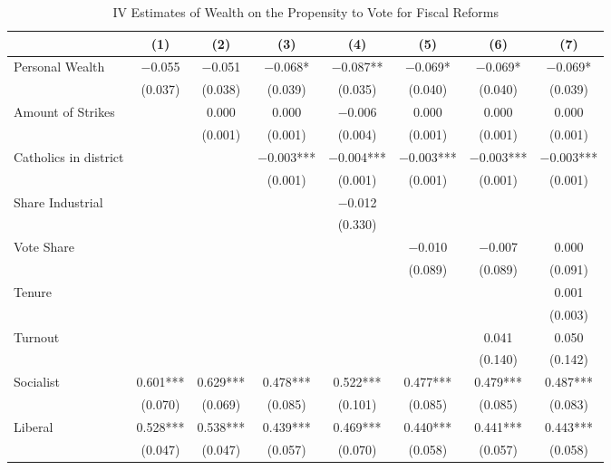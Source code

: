 \begin{table}

\caption{\label{tab:ivresults}IV Estimates of Wealth on the Propensity to Vote for Fiscal Reforms}
\centering
\begin{tabular}[t]{lccccccc}
\toprule
  & (1) & (2) & (3) & (4) & (5) & (6) & (7)\\
\midrule
Personal Wealth & \num{-0.055} & \num{-0.051} & \num{-0.068}* & \num{-0.087}** & \num{-0.069}* & \num{-0.069}* & \num{-0.069}*\\
 & (\num{0.037}) & (\num{0.038}) & (\num{0.039}) & (\num{0.035}) & (\num{0.040}) & (\num{0.040}) & (\num{0.039})\\
Amount of Strikes &  & \num{0.000} & \num{0.000} & \num{-0.006} & \num{0.000} & \num{0.000} & \num{0.000}\\
 &  & (\num{0.001}) & (\num{0.001}) & (\num{0.004}) & (\num{0.001}) & (\num{0.001}) & (\num{0.001})\\
Catholics in district &  &  & \num{-0.003}*** & \num{-0.004}*** & \num{-0.003}*** & \num{-0.003}*** & \num{-0.003}***\\
 &  &  & (\num{0.001}) & (\num{0.001}) & (\num{0.001}) & (\num{0.001}) & (\num{0.001})\\
Share Industrial &  &  &  & \num{-0.012} &  &  & \\
 &  &  &  & (\num{0.330}) &  &  & \\
Vote Share &  &  &  &  & \num{-0.010} & \num{-0.007} & \num{0.000}\\
 &  &  &  &  & (\num{0.089}) & (\num{0.089}) & (\num{0.091})\\
Tenure &  &  &  &  &  &  & \num{0.001}\\
 &  &  &  &  &  &  & (\num{0.003})\\
Turnout &  &  &  &  &  & \num{0.041} & \num{0.050}\\
 &  &  &  &  &  & (\num{0.140}) & (\num{0.142})\\
Socialist & \num{0.601}*** & \num{0.629}*** & \num{0.478}*** & \num{0.522}*** & \num{0.477}*** & \num{0.479}*** & \num{0.487}***\\
 & (\num{0.070}) & (\num{0.069}) & (\num{0.085}) & (\num{0.101}) & (\num{0.085}) & (\num{0.085}) & (\num{0.083})\\
Liberal & \num{0.528}*** & \num{0.538}*** & \num{0.439}*** & \num{0.469}*** & \num{0.440}*** & \num{0.441}*** & \num{0.443}***\\
 & (\num{0.047}) & (\num{0.047}) & (\num{0.057}) & (\num{0.070}) & (\num{0.058}) & (\num{0.057}) & (\num{0.058})\\

\end{tabular}
\end{table}
